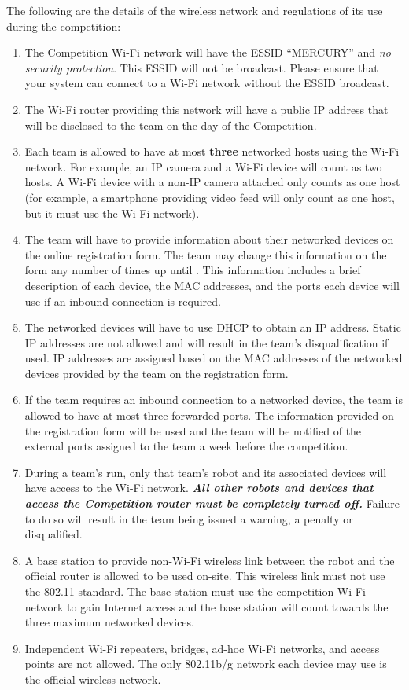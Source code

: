 The following are the details of the wireless network and regulations of its use during the competition:

\begin{enumerate}
\item The Competition Wi-Fi network will have the ESSID “MERCURY” and \textit{no security protection}. This ESSID will not be broadcast. Please ensure that your system can connect to a Wi-Fi network without the ESSID broadcast.
\item The Wi-Fi router providing this network will have a public IP address that will be disclosed to the team on the day of the Competition.
\item Each team is allowed to have at most \textbf{three} networked hosts using the Wi-Fi network. For example, an IP camera and a Wi-Fi device will count as two hosts. A Wi-Fi device with a non-IP camera attached only counts as one host (for example, a smartphone providing video feed will only count as one host, but it must use the Wi-Fi network).
\item The team will have to provide information about their networked devices on the online registration form. The team may change this information on the form any number of times up until \textbf{\network}. This information includes a brief description of each device, the MAC addresses, and the ports each device will use if an inbound connection is required.
\item The networked devices will have to use DHCP to obtain an IP address. Static IP addresses are not allowed and will result in the team's disqualification if used. IP addresses are assigned based on the MAC addresses of the networked devices provided by the team on the registration form.
\item If the team requires an inbound connection to a networked device, the team is allowed to have at most three forwarded ports. The information provided on the registration form will be used and the team will be notified of the external ports assigned to the team a week before the competition.
\item During a team's run, only that team's robot and its associated devices will have access to the Wi-Fi network. \textbf{\textit{All other robots and devices that access the Competition router must be completely turned off.}} Failure to do so will result in the team being issued a warning, a penalty or disqualified.
\item A base station to provide non-Wi-Fi wireless link between the robot and the official router is allowed to be used on-site. This wireless link must not use the 802.11 standard. The base station must use the competition Wi-Fi network to gain Internet access and the base station will count towards the three maximum networked devices.
\item Independent Wi-Fi repeaters, bridges, ad-hoc Wi-Fi networks, and access points are not allowed. The only 802.11b/g network each device may use is the official wireless network.
\end{enumerate}

